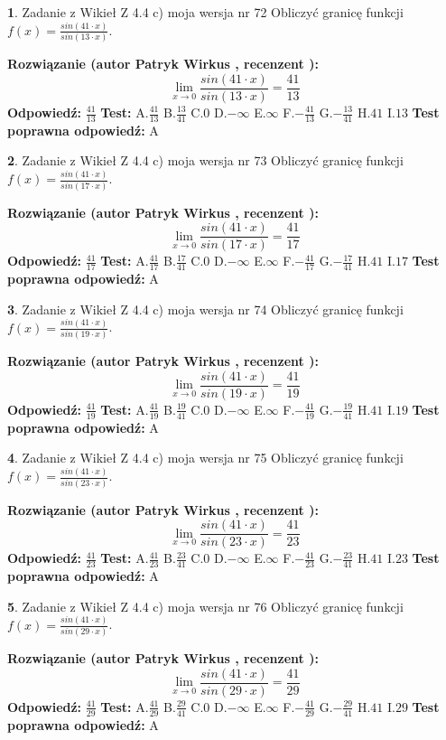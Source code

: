 \documentclass[12pt, a4paper]{article}
\theoremstyle{definition} %
\newtheorem{zad}{}
\newcommand{\zadStart}[1]{\begin{zad}#1\newline}
\newcommand{\zadStop}{\end{zad}}
\newcommand{\rozwStart}[2]{\noindent \textbf{Rozwiązanie (autor #1 , recenzent #2): }\newline}
\newcommand{\rozwStop}{\newline}
\newcommand{\odpStart}{\noindent \textbf{Odpowiedź:}\newline}
\newcommand{\odpStop}{\newline}
\newcommand{\testStart}{\noindent \textbf{Test:}\newline}
\newcommand{\testStop}{\newline}
\newcommand{\kluczStart}{\noindent \textbf{Test poprawna odpowiedź:}\newline}
\newcommand{\kluczStop}{\newline}
\begin{document}
\zadStart{Zadanie z Wikieł Z 4.4 c) moja wersja nr 72}
Obliczyć granicę funkcji $f(x)=\frac{sin(41\cdot x)}{sin(13\cdot x)}$.
\zadStop
\rozwStart{Patryk Wirkus}{}
$$\lim\limits_{x\to 0}\frac{sin(41\cdot x)}{sin(13\cdot x)}=
\frac{41}{13}$$
\rozwStop
\odpStart
$\frac{41}{13}$
\odpStop
\testStart
A.$\frac{41}{13}$
B.$\frac{13}{41}$
C.$0$
D.$-\infty$
E.$\infty$
F.$-\frac{41}{13}$
G.$-\frac{13}{41}$
H.$41$
I.$13$
\testStop
\kluczStart
A
\kluczStop



\zadStart{Zadanie z Wikieł Z 4.4 c) moja wersja nr 73}
Obliczyć granicę funkcji $f(x)=\frac{sin(41\cdot x)}{sin(17\cdot x)}$.
\zadStop
\rozwStart{Patryk Wirkus}{}
$$\lim\limits_{x\to 0}\frac{sin(41\cdot x)}{sin(17\cdot x)}=
\frac{41}{17}$$
\rozwStop
\odpStart
$\frac{41}{17}$
\odpStop
\testStart
A.$\frac{41}{17}$
B.$\frac{17}{41}$
C.$0$
D.$-\infty$
E.$\infty$
F.$-\frac{41}{17}$
G.$-\frac{17}{41}$
H.$41$
I.$17$
\testStop
\kluczStart
A
\kluczStop



\zadStart{Zadanie z Wikieł Z 4.4 c) moja wersja nr 74}
Obliczyć granicę funkcji $f(x)=\frac{sin(41\cdot x)}{sin(19\cdot x)}$.
\zadStop
\rozwStart{Patryk Wirkus}{}
$$\lim\limits_{x\to 0}\frac{sin(41\cdot x)}{sin(19\cdot x)}=
\frac{41}{19}$$
\rozwStop
\odpStart
$\frac{41}{19}$
\odpStop
\testStart
A.$\frac{41}{19}$
B.$\frac{19}{41}$
C.$0$
D.$-\infty$
E.$\infty$
F.$-\frac{41}{19}$
G.$-\frac{19}{41}$
H.$41$
I.$19$
\testStop
\kluczStart
A
\kluczStop



\zadStart{Zadanie z Wikieł Z 4.4 c) moja wersja nr 75}
Obliczyć granicę funkcji $f(x)=\frac{sin(41\cdot x)}{sin(23\cdot x)}$.
\zadStop
\rozwStart{Patryk Wirkus}{}
$$\lim\limits_{x\to 0}\frac{sin(41\cdot x)}{sin(23\cdot x)}=
\frac{41}{23}$$
\rozwStop
\odpStart
$\frac{41}{23}$
\odpStop
\testStart
A.$\frac{41}{23}$
B.$\frac{23}{41}$
C.$0$
D.$-\infty$
E.$\infty$
F.$-\frac{41}{23}$
G.$-\frac{23}{41}$
H.$41$
I.$23$
\testStop
\kluczStart
A
\kluczStop



\zadStart{Zadanie z Wikieł Z 4.4 c) moja wersja nr 76}
Obliczyć granicę funkcji $f(x)=\frac{sin(41\cdot x)}{sin(29\cdot x)}$.
\zadStop
\rozwStart{Patryk Wirkus}{}
$$\lim\limits_{x\to 0}\frac{sin(41\cdot x)}{sin(29\cdot x)}=
\frac{41}{29}$$
\rozwStop
\odpStart
$\frac{41}{29}$
\odpStop
\testStart
A.$\frac{41}{29}$
B.$\frac{29}{41}$
C.$0$
D.$-\infty$
E.$\infty$
F.$-\frac{41}{29}$
G.$-\frac{29}{41}$
H.$41$
I.$29$
\testStop
\kluczStart
A
\kluczStop
\end{document}
